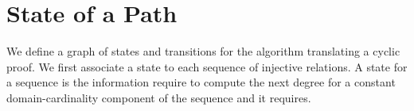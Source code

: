 \documentclass{lmcs}
\newtheorem{definition}[theorem]{Definition}
\begin{document}
\section{State of a Path}
We define a graph of states and transitions for the algorithm translating a cyclic proof. We first
associate a state to each sequence of injective relations. A state for a sequence is the information 
require to compute the next degree for a constant domain-cardinality component of the 
sequence and it requires.

%
\end{document}
